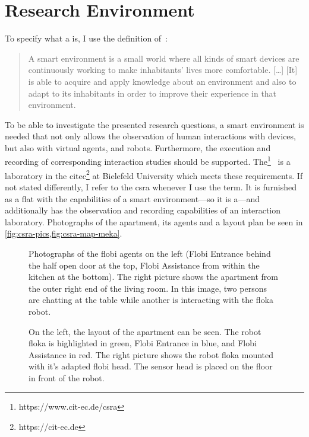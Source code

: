 \section{Research Environment}\label{sec.csra}

To specify what a is, I use the definition of~:
\blockcquote[p. 3]{Cook2005}{
	A \gls{smart environment} is a small world where all kinds of smart \glspl{device} are continuously working to make inhabitants' lives more comfortable. [\dots] 
	[It] is able to acquire and apply knowledge about an environment and also to adapt to its inhabitants in order to improve their experience in that environment.
}
To be able to investigate the presented research questions, a \gls{smart environment} is needed that not only allows the observation of human interactions with \glspl{device}, but also with \glspl{virtual agent}, and \glspl{robot}.
Furthermore, the execution and recording of corresponding interaction studies should be supported.
The\footnote{https://www.cit-ec.de/csra}~\cite{Wrede2017} is a laboratory in the \gls{citec}\footnote{https://cit-ec.de} at Bielefeld University which meets these requirements.
If not stated differently, I refer to the \gls{csra} whenever I use the term.
It is furnished as a flat with the capabilities of a \gls{smart environment}---so it is a---and additionally has the observation and recording capabilities of an interaction laboratory.
Photographs of the \gls{apartment}, its agents and a layout plan be seen in \cref{fig:csra-pics,fig:csra-map-meka}.
\begin{figure}[t]
	\centering
    \def\svgwidth{\textwidth}
    
	\caption[Virtual agents and scene with robot in the CSRA]{\label{fig:csra-pics} 
	Photographs of the \gls{flobi} agents on the left (\gls{Flobi Entrance} behind the half open door at the top, \gls{Flobi Assistance} from within the kitchen at the bottom). 
	The right picture shows the \gls{apartment} from the outer right end of the living room.
	In this image, two persons are chatting at the table while another is interacting with the \gls{floka} \gls{robot}.
	}
\end{figure}
\begin{figure}[t]
	\centering
    \def\svgwidth{\textwidth}
    
	\caption[Layout of the CSRA and Floka]{\label{fig:csra-map-meka} 
	On the left, the layout of the \gls{apartment} can be seen.
	The \gls{robot} \gls{floka} is highlighted in green, \gls{Flobi Entrance} in blue, and \gls{Flobi Assistance} in red.
	The right picture shows the \gls{robot} \gls{floka} mounted with it's adapted \gls{flobi} head.
	The sensor head is placed on the floor in front of the \gls{robot}.
	}
\end{figure}
